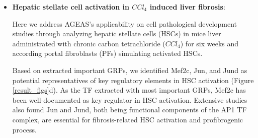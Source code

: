 \documentclass[fleqn,10pt]{wlscirep}
\begin{document}
\begin{itemize}


      \item {\textbf{Hepatic stellate cell activation in $CCl_4$ induced liver fibrosis}}:

        Here we address AGEAS's applicability on cell pathological development studies through analyzing hepatic stellate cells (HSCs) in mice liver administrated with chronic carbon tetrachloride ($CCl_4$) for six weeks and according portal fibroblasts (PFs) simulating activated HSCs.

        Based on extracted important GRPs, we identified Mef2c, Jun, and Jund as potential representatives of key regulatory elements in HSC activation (Figure \ref{result_figs}d).
        As the TF extracted with most important GRPs, Mef2c has been well-documented as key regulator in HSC activation. \cite{mef2c_1, mef2c_2, mef2c_3}
        Extensive studies also found Jun and Jund, both being functional components of the AP1 TF complex, are essential for fibrosis-related HSC activation and profibrogenic process. \cite{ap1_hsc_1, ap1_hsc_2, ap1_hsc_3, ap1_hsc_4}


\end{itemize}
\end{document}
